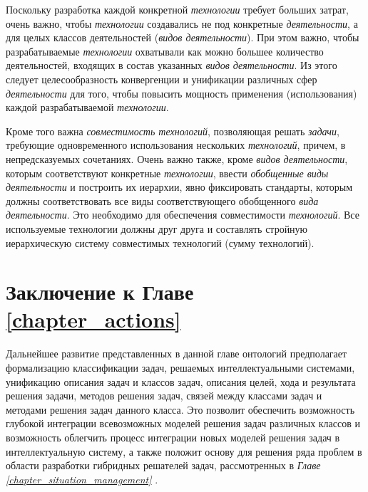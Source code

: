 Поскольку разработка каждой конкретной \textit{технологии} требует больших затрат, очень важно, чтобы \textit{технологии} создавались не под конкретные \textit{деятельности}, а для целых классов деятельностей (\textit{видов деятельности}). При этом важно, чтобы разрабатываемые \textit{технологии} охватывали как можно большее количество деятельностей, входящих в состав указанных \textit{видов деятельности}. Из этого следует целесообразность конвергенции и унификации различных сфер \textit{деятельности} для того, чтобы повысить мощность применения (использования) каждой разрабатываемой \textit{технологии}.

Кроме того важна \textit{совместимость технологий}, позволяющая решать \textit{задачи}, требующие одновременного использования нескольких \textit{технологий}, причем, в непредсказуемых сочетаниях. Очень важно также, кроме \textit{видов деятельности}, которым соответствуют конкретные \textit{технологии}, ввести \textit{обобщенные виды деятельности} и построить их иерархии, явно фиксировать стандарты, которым должны соответствовать все виды соответствующего обобщенного \textit{вида деятельности}. Это необходимо для обеспечения совместимости \textit{технологий}. Все используемые технологии должны  друг друга и составлять стройную иерархическую систему совместимых технологий (сумму технологий).

\section*{Заключение к Главе \ref{chapter_actions}}

Дальнейшее развитие представленных в данной главе онтологий предполагает формализацию классификации задач, решаемых интеллектуальными системами, унификацию описания задач и классов задач, описания целей, хода и результата решения задачи, методов решения задач, связей между классами задач и методами решения задач данного класса.
Это позволит обеспечить возможность глубокой интеграции всевозможных моделей решения задач различных классов и возможность облегчить процесс интеграции новых моделей решения задач в интеллектуальную систему, а также положит основу для решения ряда проблем в области разработки гибридных решателей задач, рассмотренных в \textit{Главе \ref{chapter_situation_management} }.

%
